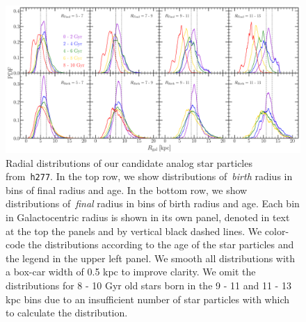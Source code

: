 \documentclass[a4paper, fleqn, usenatbib, useAMS]{mnras}
\begin{document}
\begin{figure} 
\centering 
\includegraphics[scale = 0.32]{decomposition2.pdf} 
\caption{Radial distributions of our candidate analog star particles 
from~\texttt{h277}. In the top row, we show distributions of~\textit{birth} 
radius in bins of final radius and age. In the bottom row, we show 
distributions of~\textit{final} radius in bins of birth radius and age. Each 
bin in Galactocentric radius is shown in its own panel, denoted in text at the 
top the panels and by vertical black dashed lines. We color-code the 
distributions according to the age of the star particles and the legend in the 
upper left panel. We smooth all distributions with a box-car width of 0.5 kpc 
to improve clarity. We omit the distributions for 8 - 10 Gyr old stars born in 
the 9 - 11 and 11 - 13 kpc bins due to an insufficient number of star particles 
with which to calculate the distribution. }
\label{fig:h277_decomposition} 
\end{figure} 
\end{document}
